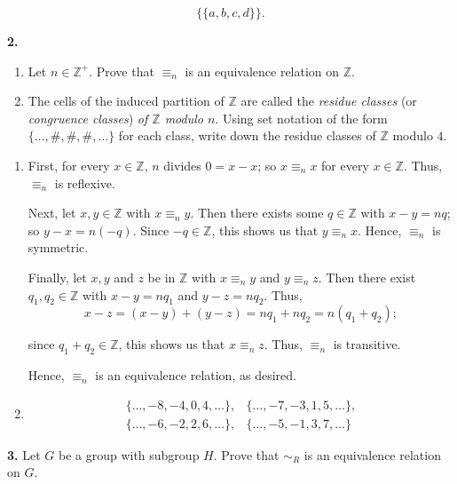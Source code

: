\documentclass[10pt,]{book}
\theoremstyle{plain}
\theoremstyle{definition}
\theoremstyle{definition}
\theoremstyle{definition}
\theoremstyle{definition}
\numberwithin{equation}{section}
\def\Z{\mathbb{Z}}
\def\simr{\sim_R}
\newcommand{\amp}{ & }
\begin{document}
%
\begin{equation*}

      \{\{a,b,c,d\}\}.
    
\end{equation*}
\par\smallskip
\noindent\textbf{2.}\quad{}\leavevmode%
\begin{enumerate}[label=(\alph*)]
\item\hypertarget{li-416}{}
            Let  \(n\in \Z^+\). Prove that  \(\equiv_n\) is an equivalence relation on \(\Z\).
\item\hypertarget{li-417}{}
            The cells of the induced partition of \(\Z\) are called
            the \emph{residue classes} (or \emph{congruence classes}) \emph{of \(\Z\) modulo \(n\)}.  Using
            set notation of the form \(\{\ldots,\#, \#,\#,\ldots\}\)
            for each class, write down the residue classes of \(\Z\)
            modulo \(4\).
\end{enumerate}
\par\smallskip
\leavevmode%
\begin{enumerate}[label=(\alph*)]
\item\hypertarget{li-418}{}
          First, for every \(x \in \Z\), \(n\)
          divides \(0=x-x\); so \(x\equiv_n x\) for every \(x\in
          \Z\).  Thus, \(\equiv_n\) is reflexive.

          Next, let \(x,y \in \Z\) with \(x\equiv_n y\).  Then
          there exists some \(q\in \Z\) with \(x-y=nq\); so \(y-x=n(-q)\).
          Since \(-q\in \Z\), this shows us that \(y\equiv_n x\).  Hence,
          \(\equiv_n\) is symmetric.

          Finally, let \(x,y\) and \(z\) be in \(\Z\) with \(x\equiv_n
          y\) and \(y\equiv_nz\).  Then there exist \(q_1,q_2 \in \Z\) with
          \(x-y=nq_1\) and \(y-z=nq_2\).  Thus,
\begin{equation*}

            x-z=(x-y)+(y-z)=nq_1+nq_2=n(q_1+q_2);
          
\end{equation*}

          since \(q_1+q_2 \in \Z\),
          this shows us that \(x\equiv_n z\).  Thus, \(\equiv_n\) is transitive.

          Hence, \(\equiv_n\) is an equivalence relation, as desired.
\item\hypertarget{li-419}{}
\begin{align*}
\{\ldots,-8,-4,0,4,\ldots\},\amp 
            \{\ldots,-7,-3,1,5,\ldots\},\\
\{\ldots,-6,-2,2,6,\ldots\},\amp 
            \{\ldots,-5,-1,3,7,\ldots\}
\end{align*}

\end{enumerate}
\par\smallskip
\noindent\textbf{3.}\quad{}
        Let \(G\) be a group with subgroup \(H\). Prove that \(\simr\) is an equivalence relation on \(G\).
\par\smallskip
\end{document}

